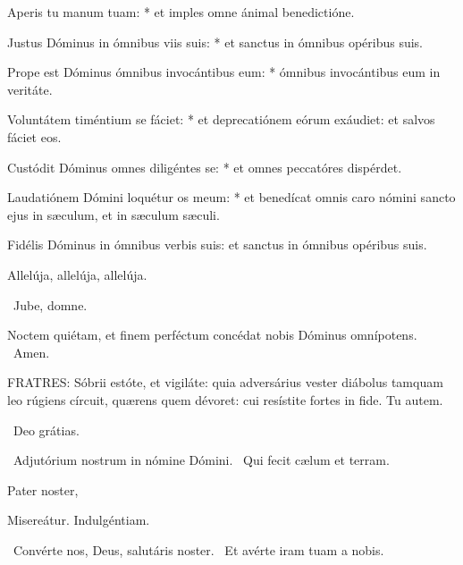 Aperis tu manum tuam: * et imples omne ánimal benedictióne.

Justus Dóminus in ómnibus viis suis: * et sanctus in ómnibus opéribus suis.

Prope est Dóminus ómnibus invocántibus eum: * ómnibus invocántibus eum in veritáte.

Voluntátem timéntium se fáciet: * et deprecatiónem eórum exáudiet: et salvos fáciet eos.

Custódit Dóminus omnes diligéntes se: * et omnes peccatóres dispérdet.

Laudatiónem Dómini loquétur os meum: * et benedícat omnis caro nómini sancto ejus in sæculum, et in sæculum sæculi.


 Fidélis Dóminus in ómnibus verbis suis: et sanctus in ómnibus opéribus suis.


 Allelúja, allelúja, allelúja.




\sectionornament


\V\ Jube, domne.

 Noctem quiétam, et finem perféctum concédat nobis Dóminus omnípotens. \R\ Amen.


\lettrine[lines=2]{F}{RATRES}: Sóbrii estóte, et vigiláte: quia adversárius vester diábolus tamquam leo rúgiens círcuit, quærens quem dévoret: cui resístite fortes in fide. Tu autem.

\R\ Deo grátias.

\V\ Adjutórium nostrum in nómine Dómini. \R\ Qui fecit cælum et terram.

Pater noster, 

 Misereátur. Indulgéntiam.

\V\ Convérte nos, Deus, salutáris noster. \R\ Et avérte iram tuam a nobis.

